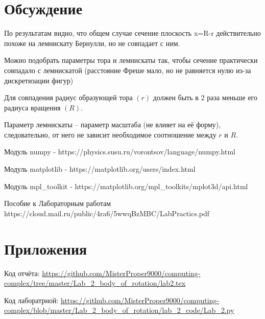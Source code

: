\documentclass[a4]{article}
\begin{document}
\section{Обсуждение}
По результатам видно, что общем случае сечение плоскость x=R-r действительно похоже на лемнискату Бернулли, но не совпадает с ним.

Можно подобрать параметры тора и лемнискаты так, чтобы сечение практически совпадало с лемнискатой (расстояние Фреше мало, но не равняется нулю из-за дискретизации фигур)

Для совпадения радиус образующей тора $(r)$ должен быть в $2$ раза меньше его радиуса вращения $(R).$

Параметр лемнискаты – параметр масштаба (не влияет на её форму), следовательно, от него не зависит необходимое соотношение между $r$ и $R.$

\begin{thebibliography}{}
      Модуль numpy  -  https://physics.susu.ru/vorontsov/language/numpy.html
    
    Модуль matplotlib - https://matplotlib.org/users/index.html
    
    Модуль mpl\_toolkit - https://matplotlib.org/mpl\_toolkits/mplot3d/api.html
    
    Пособие к Лабораторным работам https://cloud.mail.ru/public/4ra6/5wwqBzMBC/LabPractics.pdf
\end{thebibliography}

\section{Приложения}

Код отчёта:\; \url{https://github.com/MisterProper9000/computing-complex/tree/master/Lab_2_body_of_rotation/lab2.tex}

Код лаборатрной:\; \url{https://github.com/MisterProper9000/computing-complex/blob/master/Lab_2_body_of_rotation/lab_2_code/Lab_2.py}


\end{document}
